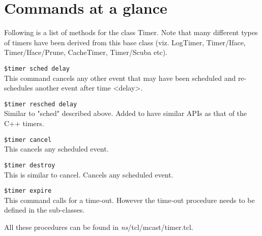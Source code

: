 \section{Commands at a glance}
\label{sec:timercommand}

Following is a list of methods for the class Timer. Note that many
different types of timers have been derived from this base class (viz.
LogTimer, Timer/Iface, Timer/Iface/Prune, CacheTimer, Timer/Scuba etc).
\begin{flushleft}
{\tt \$timer sched \<delay\>}\\
This command cancels any other event that may have been scheduled and re-schedules
another event after time <delay>.


{\tt \$timer resched \<delay\>}\\
Similar to "sched" described above. Added to have similar APIs as that of the
C++ timers.


{\tt \$timer cancel}\\
This cancels any scheduled event.


{\tt \$timer destroy}\\
This is similar to cancel. Cancels any scheduled event.


{\tt \$timer expire}\\
This command calls for a time-out. However the time-out procedure needs to be
defined in the sub-classes.


All these procedures can be found in \emph{ns}/tcl/mcast/timer.tcl.
\end{flushleft}
\endinput
